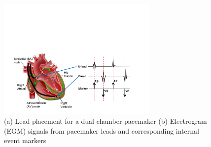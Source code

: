 %
 \begin{figure}[!t]
	\centering
	\includegraphics[width=0.7\textwidth]{figs/egm.pdf}
	
	\caption{\small (a) Lead placement for a dual chamber pacemaker (b) Electrogram (EGM) signals from pacemaker leads and corresponding internal event markers}
	\label{fig:probes}
	\vspace{-10pt}
\end{figure} 
